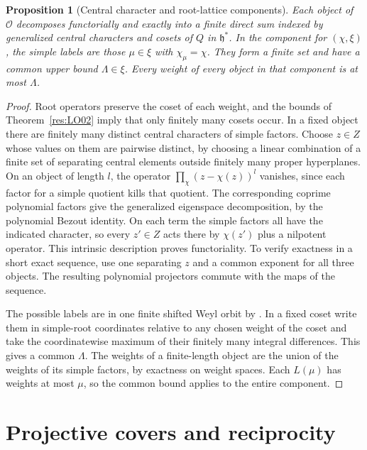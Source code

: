 \documentclass[11pt,oneside,openany]{book}
\newtheorem{proposition}[theorem]{Proposition}
\theoremstyle{definition}
\theoremstyle{remark}
\begin{document}
\begin{proposition}[Central character and root-lattice components]
\label{res:LO03}
Each object of \(\mathcal O\) decomposes functorially and exactly
into a finite direct sum indexed by generalized central characters
and cosets of \(Q\) in \(\mathfrak h^*\).
In the component for \((\chi,\xi)\), the simple labels are those
\(\mu\in\xi\) with \(\chi_\mu=\chi\). They form a finite set and
have a common upper bound \(\Lambda\in\xi\). Every weight of every
object in that component is at most \(\Lambda\).
\end{proposition}
\begin{proof}
Root operators preserve the coset of each weight, and the bounds
of Theorem~\ref{res:LO02} imply that only finitely many cosets occur.
In a fixed object there are finitely many distinct central
characters of simple factors. Choose \(z\in Z\) whose values on
them are pairwise distinct, by choosing a linear combination of
a finite set of separating central elements outside finitely many
proper hyperplanes. On an object of length \(l\), the operator
\(\prod_{\chi}(z-\chi(z))^l\) vanishes, since each factor for a
simple quotient kills that quotient. The corresponding coprime
polynomial factors give the generalized eigenspace decomposition,
by the polynomial Bezout identity. On each term the simple factors
all have the indicated character, so every \(z'\in Z\) acts there
by \(\chi(z')\) plus a nilpotent operator. This intrinsic
description proves functoriality. To verify exactness in a short
exact sequence, use one separating \(z\) and a common exponent
for all three objects. The resulting polynomial projectors commute
with the maps of the sequence.

The possible labels are in one finite shifted Weyl orbit by
\cite[Result H08, PDF pp.~54--55]{mg-lie}. In a fixed coset write
them in simple-root coordinates relative to any chosen weight of
the coset and take the coordinatewise maximum of their finitely
many integral differences. This gives a common \(\Lambda\).
The weights of a finite-length object are the union of the
weights of its simple factors, by exactness on weight spaces.
Each \(L(\mu)\) has weights at most \(\mu\), so the common bound
applies to the entire component.
\end{proof}

\section{Projective covers and reciprocity}
\end{document}
